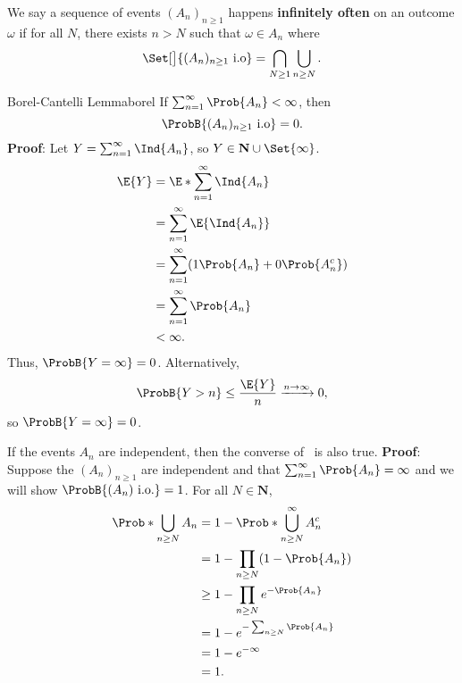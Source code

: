 \begin{Definition}{}{}
    We say a sequence of events $ (A_n)_{n\ge 1} $
    happens \textbf{infinitely often}
    on an outcome $ \omega $ if
    for all $ N $, there exists $ n>N $ such that
    $ \omega\in A_n $ where
    \[ \Set[\big]{(A_n)_{n\ge 1}\text{ i.o}}=\bigcap_{N\ge 1}\bigcup_{n\ge N}. \]
\end{Definition}
\begin{Theorem}{Borel-Cantelli Lemma}{borel}
    If $ \sum_{n=1}^{\infty}\Prob{A_n}<\infty $, then
    \[ \ProbB{(A_n)_{n\ge 1}\text{ i.o}}=0. \]
    \tcblower{}
    \textbf{Proof}:
    Let $ Y=\sum_{n=1}^{\infty}\Ind{A_n} $, so $ Y\in\mathbf{N}\cup \Set{\infty} $.
    \begin{align*}
        \E{Y}
         & =\E*{\sum_{n=1}^{\infty}\Ind{A_n}}               \\
         & =\sum_{n=1}^{\infty}\E{\Ind{A_n}}                \\
         & =\sum_{n=1}^{\infty}(1 \Prob{A_n}+0\Prob{A_n^c}) \\
         & =\sum_{n=1}^{\infty}\Prob{A_n}                   \\
         & <\infty.
    \end{align*}
    Thus, $ \ProbB{Y=\infty}=0 $. Alternatively,
    \[ \ProbB{Y>n}\le \frac{\E{Y}}{n}\xrightarrow[]{n\to\infty}0, \]
    so $ \ProbB{Y=\infty}=0 $.
\end{Theorem}
\begin{Corollary}{}{}
    If the events $ A_n $ are independent, then the converse of~ is also true.
    \tcblower{}
    \textbf{Proof}: Suppose the $ (A_n)_{n\ge 1} $ are independent
    and that $ \sum_{n=1}^{\infty}\Prob{A_n}=\infty $ and we will show
    $ \ProbB{(A_n)\text{ i.o.}}=1 $.
    For all $ N\in\mathbf{N} $,
    \begin{align*}
        \Prob*{\bigcup_{n\ge N}A_n}
         & =1-\Prob*{\bigcup_{n\ge N}^{\infty}A_n^c} \\
         & =1-\prod_{n\ge N}(1-\Prob{A_n})           \\
         & \ge 1-\prod_{n\ge N}e^{-\Prob{A_n}}       \\
         & =1-e^{-\sum_{n\ge N}\Prob{A_n}}           \\
         & =1-e^{-\infty}                            \\
         & =1.
    \end{align*}
\end{Corollary}
